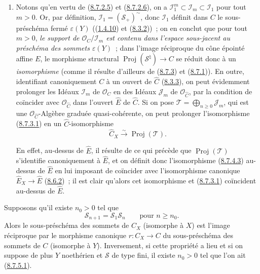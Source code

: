 \begin{remarks}[8.7.4]
\begin{enumerate}
  \item[\rm{(ii)}] Notons qu'en vertu de
  (\hyperref[II.8.7.2.5-fr]{8.7.2.5}) et
  (\hyperref[II.8.7.2.6-fr]{8.7.2.6}), on a
  $\mathcal{I}_1^m\subset\mathcal{I}_m\subset\mathcal{I}_1$ pour tout $m>0$.
  Or, par définition, $\mathcal{I}_1=(\mathcal{S}_+)^{\sim}$, donc
  $\mathcal{I}_1$ définit dans $C$ le sous-préschéma fermé
  $\varepsilon(Y)$ ((\hyperref[II.1.4.10-fr]{1.4.10}) et
  (\hyperref[II.8.3.2-fr]{8.3.2}))~; on en conclut que pour tout $m>0$,
  \emph{le support de $\mathcal{O}_C/\mathcal{I}_m$ est contenu dans l'espace
  sous-jacent au préschéma des sommets $\varepsilon(Y)$}~; dans l'image
  réciproque du cône épointé affine $E$, le morphisme structural
  $\operatorname{Proj}(\mathcal{S}^{\natural})\to C$ se réduit donc à un
  \emph{isomorphisme} (comme il résulte d'ailleurs de
  (\hyperref[II.8.7.3-fr]{8.7.3}) et
  (\hyperref[II.8.7.1-fr]{8.7.1})). En outre, identifiant canoniquement $C$ à
  un ouvert de $\widehat{C}$ (\hyperref[II.8.3.3-fr]{8.3.3}), on peut
  évidemment prolonger les Idéaux $\mathcal{I}_m$ de $\mathcal{O}_C$ en des
  Idéaux $\mathcal{J}_m$ de $\mathcal{O}_{\widehat{C}}$, par la condition de
  coïncider avec $\mathcal{O}_{\widehat{C}}$ dans l'ouvert $\widehat{E}$ de
  $\widehat{C}$. Si on pose
  $\mathcal{T}=\bigoplus_{n\geqslant 0}\mathcal{J}_m$, qui est une
  $\mathcal{O}_{\widehat{C}}$-Algèbre graduée quasi-cohérente, on peut
  prolonger l'isomorphisme (\hyperref[II.8.7.3.1-fr]{8.7.3.1}) en un
  $\widehat{C}$-isomorphisme
  \begin{equation}
  \label{II.8.7.4.3-fr}
    \widehat{C}_X\xrightarrow{\sim}\operatorname{Proj}(\mathcal{T}).
  \tag{8.7.4.3}
  \end{equation}

  En effet, au-dessus de $\widehat{E}$, il résulte de ce qui précède que
  $\operatorname{Proj}(\mathcal{T})$ s'identifie canoniquement à
  $\widehat{E}$, et on définit donc l'isomorphisme
  (\hyperref[II.8.7.4.3-fr]{8.7.4.3}) au-dessus de $\widehat{E}$ en lui
  imposant de coïncider avec l'isomorphisme canonique
  $\widehat{E}_X\to\widehat{E}$ (\hyperref[II.8.6.2-fr]{8.6.2})~; il est clair
  qu'alors cet isomorphisme et (\hyperref[II.8.7.3.1-fr]{8.7.3.1}) coïncident
  au-dessus de $\widehat{E}$.
\end{enumerate}
\end{remarks}

\begin{corollary}[8.7.5]
\label{II.8.7.5-fr}
Supposons qu'il existe $n_0>0$ tel que
\begin{equation}
\label{II.8.7.5.1-fr}
  \mathcal{S}_{n+1}=\mathcal{S}_1\mathcal{S}_n
  \qquad\text{pour }n\geqslant n_0.
\tag{8.7.5.1}
\end{equation}
Alors le sous-préschéma des sommets de $C_X$ (isomorphe à $X$) est l'image
réciproque par le morphisme canonique $r:C_X\to C$ du sous-préschéma des
sommets de $C$ (isomorphe à $Y$). Inversement, si cette propriété a lieu et
si on suppose de plus $Y$ noethérien et $\mathcal{S}$ de type fini, il existe
$n_0>0$ tel que l'on ait \textup{(\hyperref[II.8.7.5.1-fr]{8.7.5.1})}.
\end{corollary}

